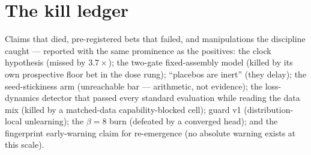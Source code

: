\documentclass[11pt]{article}
\begin{document}
\section{The kill ledger}
\label{sec:kills}
Claims that died, pre-registered bets that failed, and manipulations the discipline
caught --- reported with the same prominence as the positives: the clock hypothesis
(missed by $3.7\times$); the two-gate fixed-assembly model (killed by its own
prospective floor bet in the dose rung); ``placebos are inert'' (they delay);
the seed-stickiness arm (unreachable bar --- arithmetic, not evidence); the
loss-dynamics detector that passed every standard evaluation while reading the data
mix (killed by a matched-data capability-blocked cell); guard v1 (distribution-local
unlearning); the $\beta{=}8$ burn (defeated by a converged head); and the fingerprint
early-warning claim for re-emergence (no absolute warning exists at this scale).



\end{document}
